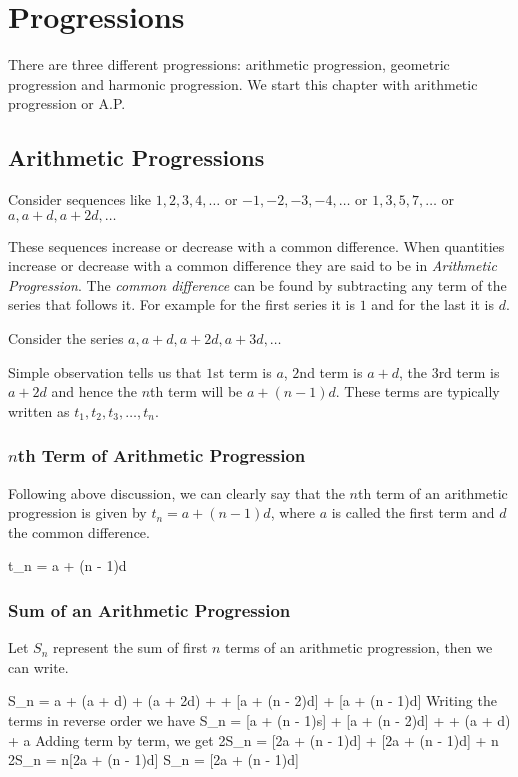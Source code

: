 \chapter{Progressions}
There are three different progressions: arithmetic progression, geometric progression and harmonic progression. We start this
chapter with arithmetic progression or A.P.

\section{Arithmetic Progressions}
Consider sequences like $1, 2, 3, 4, \ldots$ or $-1, -2, -3, -4, \ldots$ or $1, 3, 5, 7, \ldots$ or $a, a + d, a + 2d, \ldots$

These sequences increase or decrease with a common difference. When quantities increase or decrease with a common difference they
are said to be in {\it Arithmetic Progression}. The {\it common difference} can be found by subtracting any term of the
series that follows it. For example for the first series it is $1$ and for the last it is $d$.

Consider the series $a, a + d, a + 2d, a + 3d, \ldots$

Simple observation tells us that $1$st term is $a$, $2$nd term is $a + d$, the $3$rd term is $a + 2d$ and hence the $n$th term will
be $a + (n - 1)d$. These terms are typically written as $t_1, t_2, t_3, \ldots, t_n$.

\subsection{$n$th Term of Arithmetic Progression}
Following above discussion, we can clearly say that the $n$th term of an arithmetic progression is given by $t_n = a + (n - 1)d$,
where $a$ is called the first term and $d$ the common difference.

\placeformula[eq:progression-tn]\startformula t_n = a + (n - 1)d\stopformula

\subsection{Sum of an Arithmetic Progression}
Let $S_n$ represent the sum of first $n$ terms of an arithmetic progression, then we can write.

\startformula S_n = a + (a + d) + (a + 2d) + \cdots + [a + (n - 2)d] + [a + (n - 1)d]\stopformula
Writing the terms in reverse order we have
\startformula S_n = [a + (n - 1)s] + [a + (n - 2)d] + \cdots + (a + d) + a\stopformula
Adding term by term, we get
\startformula 2S_n = [2a + (n - 1)d] + [2a + (n - 1)d] + \cdots{}n\stopformula
  \startformula 2S_n = n[2a + (n - 1)d]\stopformula
\placeformula[eq:progression-sn]\startformula S_n = [2a + (n - 1)d]\stopformula

